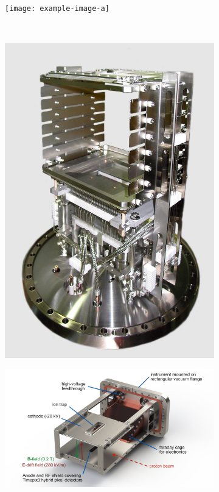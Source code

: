 \begin{figure}[!ht]
  \centering
  \begin{subfigure}[t]{0.45\textwidth}
    \texttt{[image: example-image-a]}
    \caption{}
    \label{}
  \end{subfigure}
  ~
  \begin{subfigure}[t]{0.45\textwidth}
    \includegraphics[width=\textwidth]{02_BeamDiag/figures/fig000_IPM_2}
    \caption{ \cite{Giacomini2011}}
    \label{}
  \end{subfigure}
  
  \begin{subfigure}[t]{1\textwidth}
    \includegraphics[width=\textwidth]{02_BeamDiag/figures/fig000_IPM_3}
    \caption{}
    \label{}
  \end{subfigure}
  \caption[]{}
  \label{chap2:fig:IPM_3}
\end{figure}
